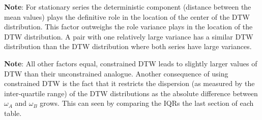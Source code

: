 \begin{table}[!ht]
\begin{threeparttable}
\begin{tablenotes}
            \item{\textbf{Note}: For stationary series the deterministic component (distance between the mean values) plays the definitive role in the location of the center of the DTW distribution. This factor outweighs the role variance plays in the location of the DTW distribution. A pair with one relatively large variance has a similar DTW distribution than the DTW distribution where both series have large variances.}
            \item{\textbf{Note}: All other factors equal, constrained DTW leads to slightly larger values of DTW than their unconstrained analogue. Another consequence of using constrained DTW is the fact that it restricts the dispersion (as measured by the inter-quartile range) of the DTW distributions as the absolute difference between $\omega_{A}$ and $\omega_{B}$ grows. This can seen by comparing the IQRs the last section of each table.}
        \end{tablenotes}
    \end{threeparttable}
\end{table}


